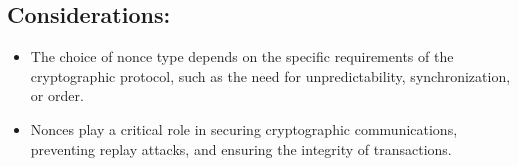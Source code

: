 \documentclass[12pt]{article}
\begin{document}
\subsection*{Considerations:}
\begin{itemize}
    \item The choice of nonce type depends on the specific requirements of the cryptographic protocol, such as the need for unpredictability, synchronization, or order.
    \item Nonces play a critical role in securing cryptographic communications, preventing replay attacks, and ensuring the integrity of transactions.
\end{itemize}
\end{document}
